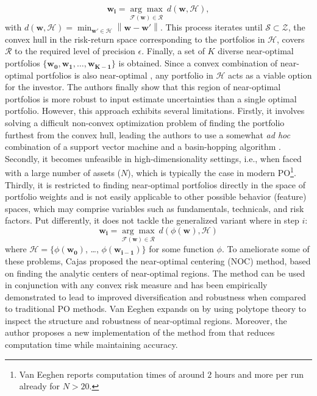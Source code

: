 \begin{equation}
\boldsymbol{w_i}=\underset{\mathcal{F}(\boldsymbol{w}) \in \mathcal{R}}{\arg \max } \ d\left(\boldsymbol{w}, \mathcal{H} \right),
\end{equation}
with $d\left(\boldsymbol{w}, \mathcal{H} \right) =\min _{\boldsymbol{w'} \in \mathcal{H}}\left\|\boldsymbol{w}-\boldsymbol{w'}\right\|$. This process iterates until $\mathcal{S} \subset \mathcal{Z}$, the convex hull in the risk-return space corresponding to the portfolios in $\mathcal{H}$, covers $\mathcal{R}$ to the required level of precision $\epsilon$. Finally, a set of $K$ diverse near-optimal portfolios $\{\boldsymbol{w_0}, \boldsymbol{w_1}, \ldots, \boldsymbol{w_{K-1}} \}$ is obtained. Since a convex combination of near-optimal portfolios is also near-optimal \cite{degraaf}, any portfolio in $\mathcal{H}$ acts as a viable option for the investor. The authors finally show that this region of near-optimal portfolios is more robust to input estimate uncertainties than a single optimal portfolio. However, this approach exhibits several limitations. Firstly, it involves solving a difficult non-convex optimization problem of finding the portfolio furthest from the convex hull, leading the authors to use a somewhat \emph{ad hoc} combination of a support vector machine \cite{wang} and a basin-hopping algorithm \cite{wales}. Secondly, it becomes unfeasible in high-dimensionality settings, i.e., when faced with a large number of assets ($N$), which is typically the case in modern PO\footnote{Van Eeghen \cite{eeghen} reports computation times of around $2$ hours and more per run already for $N>20$.}. Thirdly, it is restricted to finding near-optimal portfolios directly in the space of portfolio weights and is not easily applicable to other possible behavior (feature) spaces, which may comprise variables such as fundamentals, technicals, and risk factors. Put differently, it does not tackle the generalized variant where in step $i$:
\begin{equation}
\boldsymbol{w_i}=\underset{\mathcal{F}(\boldsymbol{w}) \in \mathcal{R}}{\arg \max } \ d\left(\phi(\boldsymbol{w}), \mathcal{H} \right)
\end{equation}
where $\mathcal{H} = \{\phi(\boldsymbol{w_0})$, \ldots, $\phi (\boldsymbol{w_{i-1}})\}$ for some function $\phi$. To ameliorate some of these problems, Cajas \cite{cajas} proposed the near-optimal centering (NOC) method, based on finding the analytic centers of near-optimal regions. The method can be used in conjunction with any convex risk measure and has been empirically demonstrated to lead to improved diversification and robustness when compared to traditional PO methods. Van Eeghen \cite{eeghen} expands on \cite{schans} by using polytope theory to inspect the structure and robustness of near-optimal regions. Moreover, the author proposes a new implementation of the method from \cite{schans} that reduces computation time while maintaining accuracy.

